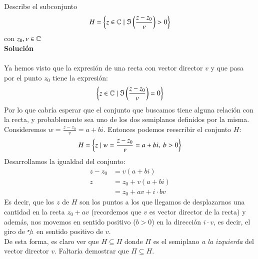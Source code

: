     \begin{th_ex}
        Describe el subconjunto
        $$
            H = \left\{z \in \mathbb{C} \mid \Im\left(\frac{z-z_0}{v}\right) > 0\right\}
        $$
        con $z_0, v \in  \mathbb{C}$\\

        \textbf{Solución}\\\\

        Ya hemos visto que la expresión de una recta con vector director $v$ y que pasa por el punto $z_0$ tiene la expresión:
        $$
            \left\{z \in \mathbb{C} \mid \Im\left(\frac{z-z_0}{v}\right) = 0\right\}
        $$
        Por lo que cabría esperar que el conjunto que buscamos tiene alguna relación con la recta, y probablemente sea uno de los dos semiplanos definidos por la misma.\\
        Consideremos $w = \frac{z-z_0}{v} = a + bi$. Entonces podemos reescribir el conjunto $H$:
        $$
            H = \left\{z \mid w = \frac{z-z_0}{v} = a + bi,\ b>0\right\}
        $$
        Desarrollamos la igualdad del conjunto:
        \begin{align*}
            z - z_0 &= v (a + bi)\\
            z &= z_0 + v(a + bi)\\
                &= z_0 + av + i\cdot bv
        \end{align*}
        Es decir, que los $z$ de $H$ son los puntos a los que llegamos de desplazarnos una cantidad en la recta $z_0 + av$ (recordemos que $v$ es vector director de la recta) y además, nos movemos en sentido positivo ($b>0$) en la dirección $i\cdot v$, es decir, el giro de $\sfrac{\pi}{2}$ en sentido positivo de $v$.\\

        De esta forma, es claro ver que $H \subseteq \Pi$ donde $\Pi$ es el semiplano \textit{a la izquierda} del vector director $v$. Faltaría demostrar que $\Pi \subseteq H$.
        \begin{center}
        \end{center}
    \end{th_ex}

